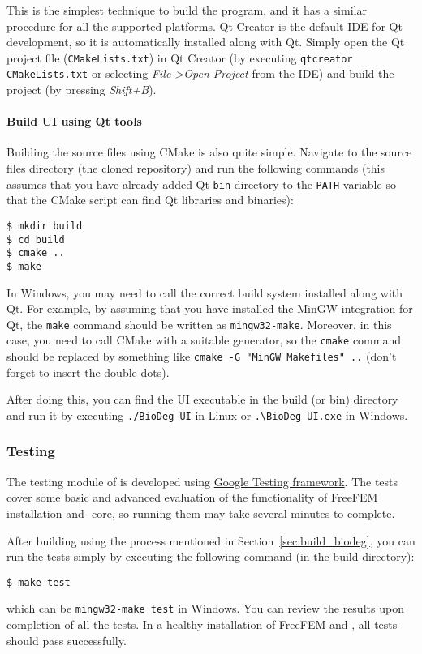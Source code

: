 This is the simplest technique to build the program, and it has a similar procedure for all the supported platforms. Qt Creator is the default IDE for Qt development, so it is automatically installed along with Qt. Simply open the Qt project file (\verb|CMakeLists.txt|) in Qt Creator (by executing \verb|qtcreator CMakeLists.txt| or selecting \textit{File->Open Project} from the IDE) and build the project (by pressing \textit{Shift+B}).

\paragraph{Build \biodeg{} UI using Qt tools}

Building the source files using CMake is also quite simple. Navigate to the source files directory (the cloned repository) and run the following commands (this assumes that you have already added Qt \verb|bin| directory to the \verb|PATH| variable so that the CMake script can find Qt libraries and binaries):

\begin{verbatim}
$ mkdir build
$ cd build
$ cmake ..
$ make
\end{verbatim}

In Windows, you may need to call the correct build system installed along with Qt. For example, by assuming that you have installed the MinGW integration for Qt, the \verb|make| command should be written as \verb|mingw32-make|. Moreover, in this case, you need to call CMake with a suitable generator, so the \verb|cmake| command should be replaced by something like \verb|cmake -G "MinGW Makefiles" ..| (don't forget to insert the double dots).

After doing this, you can find the \biodeg{} UI executable in the build (or bin) directory and run it by executing \verb|./BioDeg-UI| in Linux or \verb|.\BioDeg-UI.exe| in Windows.

\subsubsection{Testing \biodeg{}}

The testing module of \biodeg{} is developed using \href{https://github.com/google/googletest}{Google Testing framework}. The tests cover some basic and advanced evaluation of the functionality of FreeFEM installation and \biodeg{}-core, so running them may take several minutes to complete. 

After building \biodeg{} using the process mentioned in Section~\ref{sec:build_biodeg}, you can run the tests simply by executing the following command (in the build directory):

\begin{verbatim}
$ make test
\end{verbatim}
which can be \verb|mingw32-make test| in Windows. You can review the results upon completion of all the tests. In a healthy installation of FreeFEM and \biodeg{}, all tests should pass successfully. 